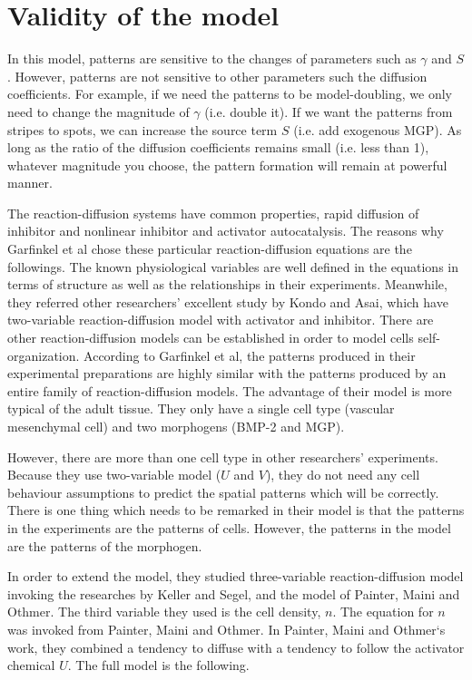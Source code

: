 \documentclass[12pt]{article}
\begin{document}
\section{Validity of the model}
In this model, patterns are sensitive to the changes of parameters such as $\gamma$ and $S$. However, patterns are not sensitive to other parameters such the diffusion coefficients. For example, if we need the patterns to be model-doubling, we only need to change the magnitude of $\gamma$ (i.e. double it). If we want the patterns from stripes to spots, we can increase the source term $S$ (i.e. add exogenous MGP). As long as the ratio of the diffusion coefficients remains small (i.e. less than 1), whatever magnitude you choose, the pattern formation will remain at powerful manner. 

The reaction-diffusion systems have common properties, rapid diffusion of inhibitor and nonlinear inhibitor and activator autocatalysis. The reasons why Garfinkel et al chose these particular reaction-diffusion equations are the followings. The known physiological variables are well defined in the equations in terms of structure as well as the relationships in their experiments. Meanwhile, they referred other researchers’ excellent study by Kondo and Asai, which have two-variable reaction-diffusion model with activator and inhibitor. There are other reaction-diffusion models can be established in order to model cells self-organization. According to Garfinkel et al, the patterns produced in their experimental preparations are highly similar with the patterns produced by an entire family of reaction-diffusion models. 
The advantage of their model is more typical of the adult tissue. They only have a single cell type (vascular mesenchymal cell) and two morphogens (BMP-2 and MGP). 

However, there are more than one cell type in other researchers’ experiments. Because they use two-variable model ($U$ and $V$), they do not need any cell behaviour assumptions to predict the spatial patterns which will be correctly. There is one thing which needs to be remarked in their model is that the patterns in the experiments are the patterns of cells. However, the patterns in the model are the patterns of the morphogen. 

In order to extend the model, they studied three-variable reaction-diffusion model invoking the researches by Keller and Segel, and the model of Painter, Maini and Othmer. The third variable they used is the cell density, $n$. The equation for $n$ was invoked from Painter, Maini and Othmer. In Painter, Maini and Othmer‘s work, they combined a tendency to diffuse with a tendency to follow the activator chemical $U$. The full model is the following.
\end{document}
